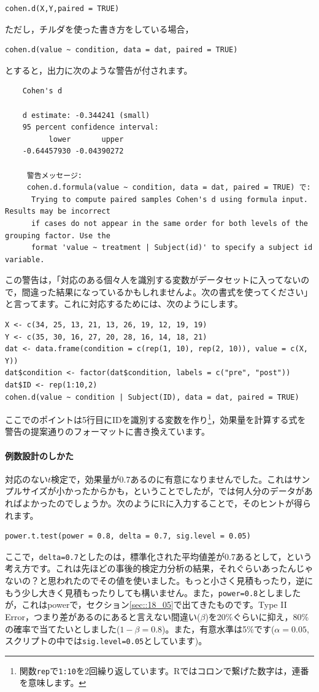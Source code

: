 \documentclass{ltjsbook}
\begin{document}
\begin{lstlisting}
cohen.d(X,Y,paired = TRUE)
\end{lstlisting}
ただし，チルダを使った書き方をしている場合，
\begin{lstlisting}
cohen.d(value ~ condition, data = dat, paired = TRUE)
\end{lstlisting}
とすると，出力に次のような警告が付されます。
\begin{tcolorbox}
\begin{verbatim}
    Cohen's d

    d estimate: -0.344241 (small)
    95 percent confidence interval:
          lower       upper 
    -0.64457930 -0.04390272 
    
     警告メッセージ: 
     cohen.d.formula(value ~ condition, data = dat, paired = TRUE) で: 
      Trying to compute paired samples Cohen's d using formula input. Results may be incorrect
      if cases do not appear in the same order for both levels of the grouping factor. Use the
      format 'value ~ treatment | Subject(id)' to specify a subject id variable.\end{verbatim}
\end{tcolorbox}
この警告は，「対応のある個々人を識別する変数がデータセットに入ってないので，間違った結果になっているかもしれませんよ。次の書式を使ってください」と言ってます。これに対応するためには、次のようにします。
\begin{lstlisting}
X <- c(34, 25, 13, 21, 13, 26, 19, 12, 19, 19)
Y <- c(35, 30, 16, 27, 20, 28, 16, 14, 18, 21)
dat <- data.frame(condition = c(rep(1, 10), rep(2, 10)), value = c(X, Y))
dat$condition <- factor(dat$condition, labels = c("pre", "post"))
dat$ID <- rep(1:10,2)
cohen.d(value ~ condition | Subject(ID), data = dat, paired = TRUE)
\end{lstlisting}
ここでのポイントは5行目にIDを識別する変数を作り\footnote{関数\texttt{rep}で\texttt{1:10}を2回繰り返しています。Rではコロンで繋げた数字は，連番を意味します。}，効果量を計算する式を警告の提案通りのフォーマットに書き換えています。

\paragraph{例数設計のしかた}
対応のない$t$検定で，効果量が0.7あるのに有意になりませんでした。これはサンプルサイズが小かったからかも，ということでしたが，では何人分のデータがあればよかったのでしょうか。次のようにRに入力することで，そのヒントが得られます。
\begin{lstlisting}
power.t.test(power = 0.8, delta = 0.7, sig.level = 0.05)
\end{lstlisting}
ここで，\texttt{delta=0.7}としたのは，標準化された平均値差が0.7あるとして，という考え方です。これは先ほどの事後的検定力分析の結果，それぐらいあったんじゃないの？と思われたのでその値を使いました。もっと小さく見積もったり，逆にもう少し大きく見積もったりしても構いません。また，\texttt{power=0.8}としましたが，これはpowerで，セクション\ref{sec::18_05}で出てきたものです。Type II Error，つまり差があるのにあると言えない間違い($\beta$)を20\%ぐらいに抑え，80\%の確率で当てたいとしました($1-\beta=0.8$)。また，有意水準は5\%です($\alpha=0.05$,スクリプトの中では\texttt{sig.level=0.05}としています)。
\end{document}
